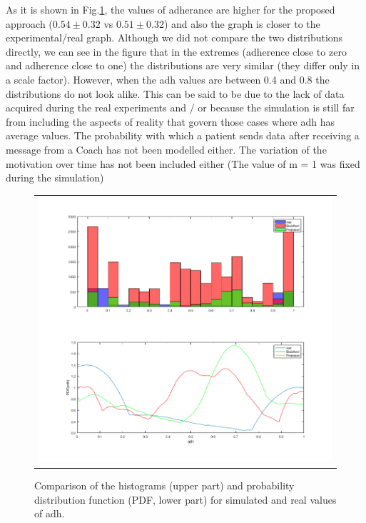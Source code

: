 \documentclass{llncs}
\begin{document}
As it is shown in Fig.\ref{Fig.REALvsSIM}, the values of adherance are higher for the proposed approach ($0.54\pm0.32$ vs $0.51\pm0.32$) and also the graph is closer to the experimental/real graph. Although we did not compare the two distributions directly, we can see in the figure that in the extremes (adherence close to zero and adherence close to one) the distributions are very similar (they differ only in a scale factor). However, when the adh values are between 0.4 and 0.8 the distributions do not look alike. This can be said to be due to the lack of data acquired during the real experiments and / or because the simulation is still far from including the aspects of reality that govern those cases where adh has average values. The probability with which a patient sends data after receiving a message from a Coach has not been modelled either. The variation of the motivation over time has not been included either (The value of m = 1 was fixed during the simulation)
\begin{figure}
  \begin{center}
  \begin{tabular}{c}
    \includegraphics[scale=0.4]{REALvsBRAIDFORDvsPROPOSED.png}\\
    \end{tabular}
    \caption{Comparison of the histograms (upper part) and probability distribution function (PDF, lower part) for simulated and real values of adh.}
     \label{Fig.REALvsSIM}
\end{center}
\end{figure} 
\end{document}
